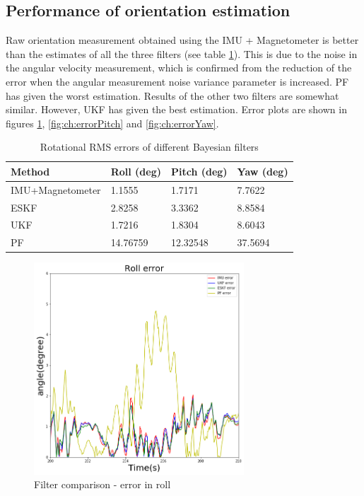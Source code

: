 \subsection{Performance of orientation estimation}
Raw orientation measurement obtained using the \gls{IMU} + Magnetometer is better than the estimates of all the three filters (see table \ref{table:ch:RMSErrorRotation}). This is due to the noise in the angular velocity measurement, which is confirmed from the reduction of the error when the angular measurement noise variance parameter is increased. \gls{PF} has given the worst estimation. Results of the other two filters are somewhat similar. However, \gls{UKF} has given the best
estimation. Error plots are shown in figures \ref{fig:ch:errorRoll}, \ref{fig:ch:errorPitch} and \ref{fig:ch:errorYaw}.
\begin{table}[h]
    \centering
    \begin{tabular}{|p{4cm}|p{3cm}|p{3cm}|p{3cm}|} 
        \hline
        \textbf{Method} & \textbf{Roll (deg)} & \textbf{Pitch (deg)} & \textbf{Yaw (deg)} \\
        \hline
        \gls{IMU}+Magnetometer & 1.1555 &1.7171 &7.7622\\
        \hline
        ESKF& 2.8258& 3.3362& 8.8584\\
        \hline
        UKF &1.7216& 1.8304& 8.6043
        \\
        \hline
        PF &14.76759& 12.32548 &37.5694
        \\
        \hline
    \end{tabular}
    \caption{Rotational \gls{RMS} errors of different Bayesian filters}
    \label{table:ch:RMSErrorRotation}
\end{table}

\begin{figure}[h]
\centering
	\includegraphics[width=0.7\textwidth]{figs/roll.png}
	\caption{Filter comparison - error in roll}
	\label{fig:ch:errorRoll}
\end{figure}

